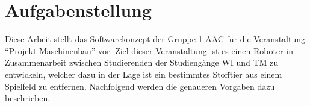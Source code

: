 \section{Aufgabenstellung}\label{sec:task}

Diese Arbeit stellt das Softwarekonzept der Gruppe 1 \ac{AAC} für die Veranstaltung \enquote{Projekt Maschinenbau} vor.
Ziel dieser Veranstaltung ist es einen Roboter in Zusammenarbeit zwischen Studierenden der Studiengänge \ac{WI} und \ac{TM} zu entwickeln, welcher dazu in der Lage ist ein bestimmtes Stofftier aus einem Spielfeld zu entfernen.
Nachfolgend werden die genaueren Vorgaben dazu beschrieben.
